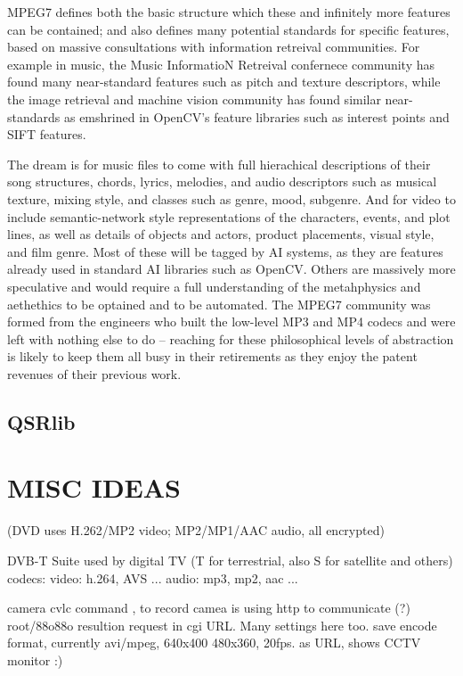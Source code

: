 \documentclass[oneside,english]{scrbook}
\begin{document}
MPEG7 defines both the basic structure which these and infinitely more features can be contained; and also defines many potential standards for specific features, based on massive consultations with information retreival communities.   For example in music, the Music InformatioN Retreival confernece community has found many near-standard features such as pitch and texture descriptors, while the image retrieval and machine vision community has found similar near-standards as emshrined in OpenCV's feature libraries such as interest points and SIFT features.

The dream is for music files to come with full hierachical descriptions of their song structures, chords, lyrics, melodies, and audio descriptors such as musical texture, mixing style, and classes such as genre, mood, subgenre.   And for video to include semantic-network style representations of the characters, events, and plot lines, as well as details of objects and actors, product placements, visual style, and film genre.  Most of these will be tagged by AI systems, as they are features already used in standard AI libraries such as OpenCV.   Others are massively more speculative and would require a full understanding of the metahphysics and aethethics to be optained and to be automated.   The MPEG7 community was formed from the engineers who built the low-level MP3 and MP4 codecs and were left with nothing else to do -- reaching for these philosophical levels of abstraction is likely to keep them all busy in their retirements as they enjoy the patent revenues of their previous work.


\section{QSRlib}

\chapter{MISC IDEAS}



(DVD uses H.262/MP2 video;  MP2/MP1/AAC audio, all encrypted)

DVB-T Suite used by digital TV (T for terrestrial, also S for satellite and others)
	codecs:
		video: h.264, AVS ...
		audio: mp3, mp2, aac ...


camera cvlc command , to record
	camea is using http to communicate (?) root/88o88o
	resultion request in cgi URL.  Many settings here too.
	save encode format, currently avi/mpeg, 640x400
	480x360, 20fps.
	as URL, shows CCTV monitor :)
\end{document}
